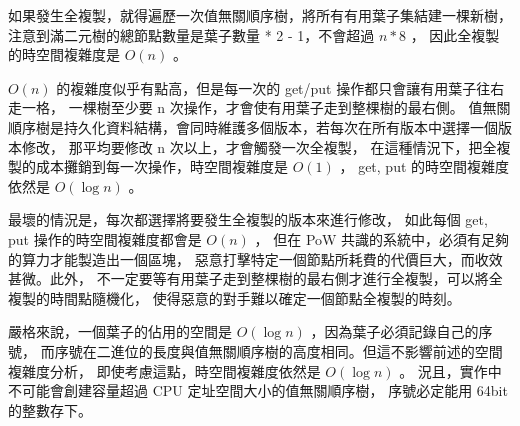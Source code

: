 如果發生全複製，就得遍歷一次值無關順序樹，將所有有用葉子集結建一棵新樹，
注意到滿二元樹的總節點數量是葉子數量 * 2 - 1，不會超過 $n * 8$ ，
因此全複製的時空間複雜度是 $O(n)$ 。

$O(n)$ 的複雜度似乎有點高，但是每一次的 get/put 操作都只會讓有用葉子往右走一格，
一棵樹至少要 n 次操作，才會使有用葉子走到整棵樹的最右側。
值無關順序樹是持久化資料結構，會同時維護多個版本，若每次在所有版本中選擇一個版本修改，
那平均要修改 n 次以上，才會觸發一次全複製，
在這種情況下，把全複製的成本攤銷到每一次操作，時空間複雜度是 $O(1)$ ，
get, put 的時空間複雜度依然是 $O(\log n)$ 。

最壞的情況是，每次都選擇將要發生全複製的版本來進行修改，
如此每個 get, put 操作的時空間複雜度都會是 $O(n)$ ，
但在 PoW 共識的系統中，必須有足夠的算力才能製造出一個區塊，
惡意打擊特定一個節點所耗費的代價巨大，而收效甚微。此外，
不一定要等有用葉子走到整棵樹的最右側才進行全複製，可以將全複製的時間點隨機化，
使得惡意的對手難以確定一個節點全複製的時刻。

嚴格來說，一個葉子的佔用的空間是 $O(\log n)$ ，因為葉子必須記錄自己的序號，
而序號在二進位的長度與值無關順序樹的高度相同。但這不影響前述的空間複雜度分析，
即使考慮這點，時空間複雜度依然是 $O(\log n)$ 。
況且，實作中不可能會創建容量超過 CPU 定址空間大小的值無關順序樹，
序號必定能用 64bit 的整數存下。